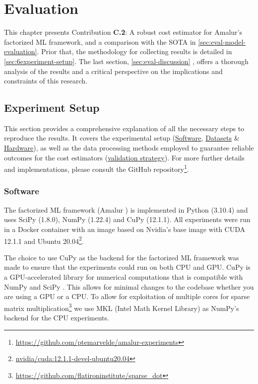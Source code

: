 
\chapter{Evaluation}
\label{chapter:evaluation-discussion}
This chapter presents Contribution \textbf{C.2}: A robust cost estimator for Amalur's factorized ML framework, and a comparison with the SOTA in \autoref{sec:eval-model-evaluation}. Prior that, the methodology for collecting results is detailed in \autoref{sec:6experiment-setup}. The last section, \autoref{sec:eval-discussion} , offers a thorough analysis of the results and a critical perspective on the implications and constraints of this research.

\section{Experiment Setup}
\label{sec:6experiment-setup}
This section provides a comprehensive explanation of all the necessary steps to reproduce the results. It covers the experimental setup (\hyperref[subsec:6-software]{Software}, \hyperref[subsec:6-datasets]{Datasets} \& \hyperref[subsec:6-hardware]{Hardware}), as well as the data processing methods employed to guarantee reliable outcomes for the cost estimators (\hyperref[subsec:6-validation-strategy]{validation strategy}). For more further details and implementations, please consult the GitHub repository\footnote{\url{https://github.com/ptemarvelde/amalur-experiments}}.

\subsection{Software}
\label{subsec:6-software}
The factorized ML framework (Amalur \cite{amalur}) is implemented in Python (3.10.4) and uses SciPy (1.8.0), NumPy (1.22.4) and CuPy (12.1.1). All experiments were run in a Docker container with an image based on Nvidia's base image with CUDA 12.1.1 and Ubuntu 20.04\footnote{\href{https://hub.docker.com/layers/nvidia/cuda/12.1.1-devel-ubuntu20.04/images/sha256-5bd13c67a4479a1c13238b470d89a92937ce68ba5f21b930d50c463e3314f657?context=explore}{nvidia/cuda:12.1.1-devel-ubuntu20.04}}.

The choice to use CuPy as the backend for the factorized ML framework was made to ensure that the experiments could run on both CPU and GPU. CuPy is a GPU-accelerated library for numerical computations that is compatible with NumPy and SciPy \cite{cupy_learningsys2017}. This allows for minimal changes to the codebase whether you are using a GPU or a CPU. To allow for exploitation of multiple cores for sparse matrix multiplication\footnote{\url{https://github.com/flatironinstitute/sparse_dot}} we use MKL (Intel Math Kernel Library) \cite{intel-mkl} as NumPy's backend for the CPU experiments.

